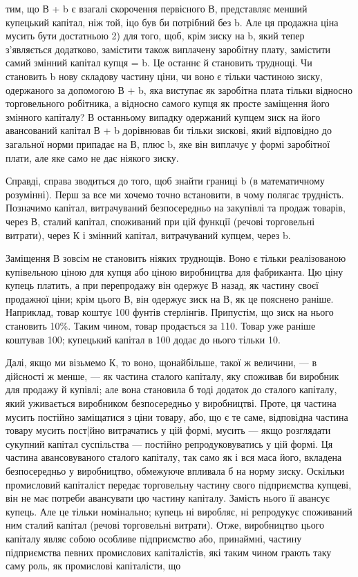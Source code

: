 тим, що В + b є взагалі скорочення первісного В, представляє
менший купецький капітал, ніж той, іцо був би потрібний без b.
Але ця продажна ціна мусить бути достатньою 2) для того, щоб,
крім зиску на b, який тепер з’являється додатково, замістити також
виплачену заробітну плату, замістити самий змінний капітал
купця = b. Це останнє й становить труднощі. Чи становить b
нову складову частину ціни, чи воно є тільки частиною зиску,
одержаного за допомогою В + b, яка виступає як заробітна плата
тільки відносно торговельного робітника, а відносно самого
купця як просте заміщення його змінного капіталу? В останньому
випадку одержаний купцем зиск на його авансований капітал
В + b дорівнював би тільки зискові, який відповідно до загальної
норми припадає на В, плюс b, яке він виплачує у формі
заробітної плати, але яке само не дає ніякого зиску.

Справді, справа зводиться до того, щоб знайти границі b (в математичному
розумінні). Перш за все ми хочемо точно встановити,
в чому полягає трудність. Позначимо капітал, витрачуваний безпосередньо
на закупівлі та продаж товарів, через В, сталий капітал,
споживаний при цій функції (речові торговельні витрати),
через К і змінний капітал, витрачуваний купцем, через b.

Заміщення В зовсім не становить ніяких труднощів. Воно є
тільки реалізованою купівельною ціною для купця або ціною
виробництва для фабриканта. Цю ціну купець платить, а при
перепродажу він одержує В назад, як частину своєї продажної
ціни; крім цього В, він одержує зиск на В, як це пояснено раніше.
Наприклад, товар коштує 100 фунтів стерлінгів. Припустім, що зиск
на нього становить 10\%. Таким чином, товар продається за
110. Товар уже раніше коштував 100; купецький капітал в 100
додає до нього тільки 10.

Далі, якщо ми візьмемо К, то воно, щонайбільше, такої ж
величини, — в дійсності ж менше, — як частина сталого капіталу,
яку споживав би виробник для продажу й купівлі; але вона становила
б тоді додаток до сталого капіталу, який уживається виробником
безпосередньо у виробництві. Проте, ця частина мусить
постійно заміщатися з ціни товару, або, що є те саме, відповідна
частина товару мусить пост|йно витрачатись у цій формі, мусить
— якщо розглядати сукупний капітал суспільства — постійно
репродуковуватись у цій формі. Ця частина авансовуваного сталого
капіталу, так само як і вся маса його, вкладена безпосередньо
у виробництво, обмежуюче впливала б на норму зиску. Оскільки
промисловий капіталіст передає торговельну частину свого підприємства
купцеві, він не має потреби авансувати цю частину
капіталу. Замість нього її авансує купець. Але це тільки номінально;
купець ні виробляє, ні репродукує споживаний ним сталий
капітал (речові торговельні витрати). Отже, виробництво
цього капіталу являє собою особливе підприємство або, принаймні,
частину підприємства певних промислових капіталістів, які таким
чином грають таку саму роль, як промислові капіталісти, що
